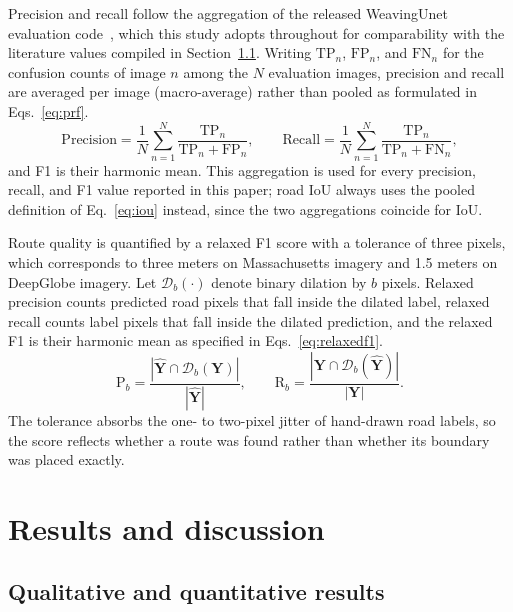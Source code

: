\documentclass[a4paper,fleqn, review]{cas-sc}
\begin{document}
Precision and recall follow the aggregation of the released WeavingUnet
evaluation code~\cite{weavingunet}, which this study adopts throughout for
comparability with the literature values compiled in
Section~\ref{subsec:sota}. Writing $\mathrm{TP}_n$, $\mathrm{FP}_n$, and
$\mathrm{FN}_n$ for the confusion counts of image $n$ among the $N$
evaluation images, precision and recall are averaged per image
(macro-average) rather than pooled as formulated in Eqs.~\eqref{eq:prf}.
%
\begin{equation}
\label{eq:prf}
\mathrm{Precision} =
\frac{1}{N}\sum_{n=1}^{N}
\frac{\mathrm{TP}_n}{\mathrm{TP}_n+\mathrm{FP}_n},
\qquad
\mathrm{Recall} =
\frac{1}{N}\sum_{n=1}^{N}
\frac{\mathrm{TP}_n}{\mathrm{TP}_n+\mathrm{FN}_n},
\end{equation}
%
and F1 is their harmonic mean. This aggregation is used for every precision,
recall, and F1 value reported in this paper; road IoU always uses the
pooled definition of Eq.~\eqref{eq:iou} instead, since the two aggregations
coincide for IoU.

Route quality is quantified by a relaxed F1 score with a tolerance of three
pixels, which corresponds to three meters on Massachusetts imagery and 1.5 meters
on DeepGlobe imagery. Let $\mathcal{D}_b(\cdot)$ denote binary dilation by $b$
pixels. Relaxed precision counts predicted road pixels that fall inside the
dilated label, relaxed recall counts label pixels that fall inside the dilated
prediction, and the relaxed F1 is their harmonic mean as specified in Eqs.~\eqref{eq:relaxedf1}.
%
\begin{equation}
\label{eq:relaxedf1}
\mathrm{P}_{b} =
\frac{\left|\hat{\mathbf{Y}} \cap \mathcal{D}_b(\mathbf{Y})\right|}
     {\left|\hat{\mathbf{Y}}\right|},
\qquad
\mathrm{R}_{b} =
\frac{\left|\mathbf{Y} \cap \mathcal{D}_b(\hat{\mathbf{Y}})\right|}
     {\left|\mathbf{Y}\right|} .
\end{equation}
%
The tolerance absorbs the one- to two-pixel jitter of hand-drawn road labels, so
the score reflects whether a route was found rather than whether its boundary was
placed exactly.

\section{Results and discussion}
\label{sec:results-discussion}

\subsection{Qualitative and quantitative results}
\label{subsec:sota}
\end{document}
